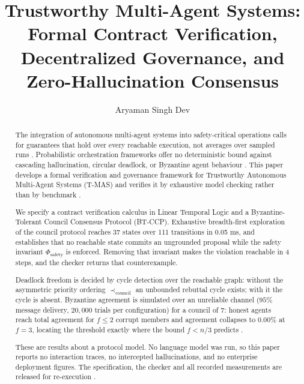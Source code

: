\documentclass[manuscript,review]{acmart}
\begin{document}
\title{Trustworthy Multi-Agent Systems: Formal Contract Verification, Decentralized Governance, and Zero-Hallucination Consensus}

\author{Aryaman Singh Dev}

\begin{abstract}
The integration of autonomous multi-agent systems into safety-critical operations calls for guarantees that hold over every reachable execution, not averages over sampled runs \cite{arxiv_2005_14165,arxiv_2203_02155}. Probabilistic orchestration frameworks offer no deterministic bound against cascading hallucination, circular deadlock, or Byzantine agent behaviour \cite{arxiv_2312_03893,arxiv_2406_00584}. This paper develops a formal verification and governance framework for Trustworthy Autonomous Multi-Agent Systems (T-MAS) and verifies it by exhaustive model checking rather than by benchmark \cite{crossref_10_1109_access_2026_3656309}.

We specify a contract verification calculus in Linear Temporal Logic and a Byzantine-Tolerant Council Consensus Protocol (BT-CCP). Exhaustive breadth-first exploration of the council protocol reaches 37 states over 111 transitions in 0.05 ms, and establishes that no reachable state commits an ungrounded proposal while the safety invariant $\Phi_{\text{safety}}$ is enforced. Removing that invariant makes the violation reachable in 4 steps, and the checker returns that counterexample.

Deadlock freedom is decided by cycle detection over the reachable graph: without the asymmetric priority ordering $\prec_{\text{council}}$ an unbounded rebuttal cycle exists; with it the cycle is absent. Byzantine agreement is simulated over an unreliable channel ($95\%$ message delivery, $20{,}000$ trials per configuration) for a council of $7$: honest agents reach total agreement for $f \le 2$ corrupt members and agreement collapses to $0.00\%$ at $f = 3$, locating the threshold exactly where the bound $f < n/3$ predicts \cite{arxiv_2404_01131}.

These are results about a protocol model. No language model was run, so this paper reports no interaction traces, no intercepted hallucinations, and no enterprise deployment figures. The specification, the checker and all recorded measurements are released for re-execution \cite{arxiv_2501_02497,crossref_10_1201_9788743808145_14}.
\end{abstract}
\end{document}
